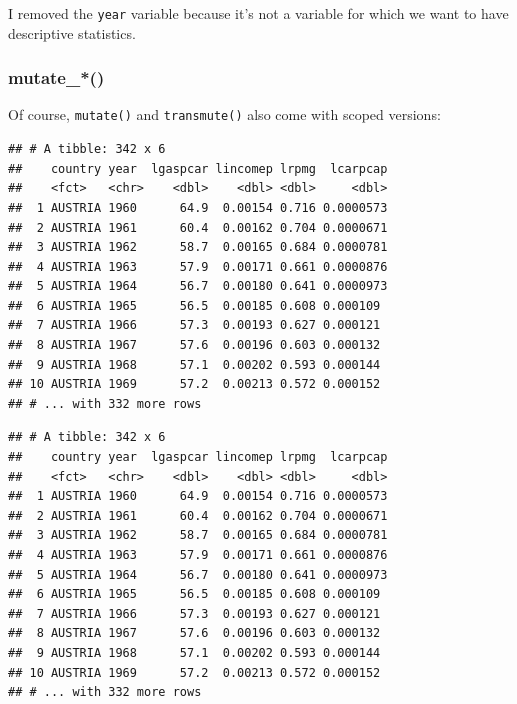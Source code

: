 \documentclass[]{gitbook}
\newenvironment{Shaded}{\begin{snugshade}}{\end{snugshade}}
\newcommand{\KeywordTok}[1]{\textcolor[rgb]{0.13,0.29,0.53}{\textbf{#1}}}
\newcommand{\NormalTok}[1]{#1}
\newcommand{\OperatorTok}[1]{\textcolor[rgb]{0.81,0.36,0.00}{\textbf{#1}}}
\newcommand{\StringTok}[1]{\textcolor[rgb]{0.31,0.60,0.02}{#1}}
\begin{document}
I removed the \texttt{year} variable because it's not a variable for which we want to have descriptive
statistics.

\hypertarget{mutate_}{%
\subsubsection{mutate\_*()}\label{mutate_}}

Of course, \texttt{mutate()} and \texttt{transmute()} also come with scoped versions:

\begin{Shaded}
\end{Shaded}

\begin{verbatim}
## # A tibble: 342 x 6
##    country year  lgaspcar lincomep lrpmg  lcarpcap
##    <fct>   <chr>    <dbl>    <dbl> <dbl>     <dbl>
##  1 AUSTRIA 1960      64.9  0.00154 0.716 0.0000573
##  2 AUSTRIA 1961      60.4  0.00162 0.704 0.0000671
##  3 AUSTRIA 1962      58.7  0.00165 0.684 0.0000781
##  4 AUSTRIA 1963      57.9  0.00171 0.661 0.0000876
##  5 AUSTRIA 1964      56.7  0.00180 0.641 0.0000973
##  6 AUSTRIA 1965      56.5  0.00185 0.608 0.000109 
##  7 AUSTRIA 1966      57.3  0.00193 0.627 0.000121 
##  8 AUSTRIA 1967      57.6  0.00196 0.603 0.000132 
##  9 AUSTRIA 1968      57.1  0.00202 0.593 0.000144 
## 10 AUSTRIA 1969      57.2  0.00213 0.572 0.000152 
## # ... with 332 more rows
\end{verbatim}

\begin{Shaded}
\end{Shaded}

\begin{verbatim}
## # A tibble: 342 x 6
##    country year  lgaspcar lincomep lrpmg  lcarpcap
##    <fct>   <chr>    <dbl>    <dbl> <dbl>     <dbl>
##  1 AUSTRIA 1960      64.9  0.00154 0.716 0.0000573
##  2 AUSTRIA 1961      60.4  0.00162 0.704 0.0000671
##  3 AUSTRIA 1962      58.7  0.00165 0.684 0.0000781
##  4 AUSTRIA 1963      57.9  0.00171 0.661 0.0000876
##  5 AUSTRIA 1964      56.7  0.00180 0.641 0.0000973
##  6 AUSTRIA 1965      56.5  0.00185 0.608 0.000109 
##  7 AUSTRIA 1966      57.3  0.00193 0.627 0.000121 
##  8 AUSTRIA 1967      57.6  0.00196 0.603 0.000132 
##  9 AUSTRIA 1968      57.1  0.00202 0.593 0.000144 
## 10 AUSTRIA 1969      57.2  0.00213 0.572 0.000152 
## # ... with 332 more rows
\end{verbatim}
\end{document}
